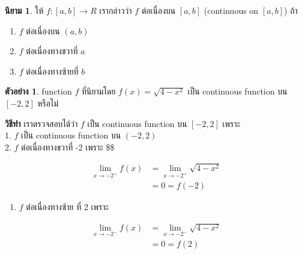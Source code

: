 \documentclass[
]{book}
\providecommand{\tightlist}{%
  \setlength{\itemsep}{0pt}\setlength{\parskip}{0pt}}
\theoremstyle{definition}
\newtheorem{definition}{นิยาม}[chapter]
\theoremstyle{definition}
\newtheorem{example}{ตัวอย่าง}[chapter]
\theoremstyle{definition}
\theoremstyle{definition}
\theoremstyle{remark}
\begin{document}
\begin{definition}

ให้ \(f : \left[ a,b\right] \rightarrow R\) เรากล่าวว่า \(f\) ต่อเนื่องบน
\(\left[ a,b\right]\) (continuous on \(\left[ a,b\right]\)) ถ้า

\begin{enumerate}
\def\labelenumi{\arabic{enumi}.}
\item
  \(f\) ต่อเนื่องบน \((a,b)\)
\item
  \(f\) ต่อเนื่องทางขวาที่ \(a\)
\item
  \(f\) ต่อเนื่องทางซ้ายที่ \(b\)
\end{enumerate}

\end{definition}

\begin{example}
\protect\hypertarget{exm:ex-cont-4}{}\label{exm:ex-cont-4}function \(f\) ที่นิยามโดย \(f\left( x\right) =\sqrt{4-x^{2}}\) เป็น continuous
function บน \(\left[ -2,2\right]\) หรือไม่
\end{example}

\textbf{วิธีทำ} เราตรวจสอบได้ว่า \(f\) เป็น continuous function บน
\(\left[ -2,2\right]\) เพราะ\\
1. \(f\) เป็น continuous function บน \(\left( -2,2\right)\)\\
2. \(f\) ต่อเนื่องทางขวาที่ -2 เพราะ \$\$

\begin{equation}
  \begin{aligned}
    \underset{x\rightarrow -2^{+}}{\lim}f(x)
        &=\underset{x\rightarrow -2^{+}}{\lim}\sqrt{4-x^{2}} \\
        &=0=f\left( -2\right)
  \end{aligned}
\end{equation}

\begin{enumerate}
\def\labelenumi{\arabic{enumi}.}
\setcounter{enumi}{2}
\tightlist
\item
  \(f\) ต่อเนื่องทางซ้าย ที่ 2 เพราะ
\end{enumerate}

\begin{equation}
  \begin{aligned}
        \underset{x\rightarrow -2^{-}}{\lim}f(x)
        &=\underset{x\rightarrow -2^{-}}{\lim}\sqrt{4-x^{2}} \\
        &=0 =f\left( 2\right)
  \end{aligned}
\end{equation}
\end{document}
